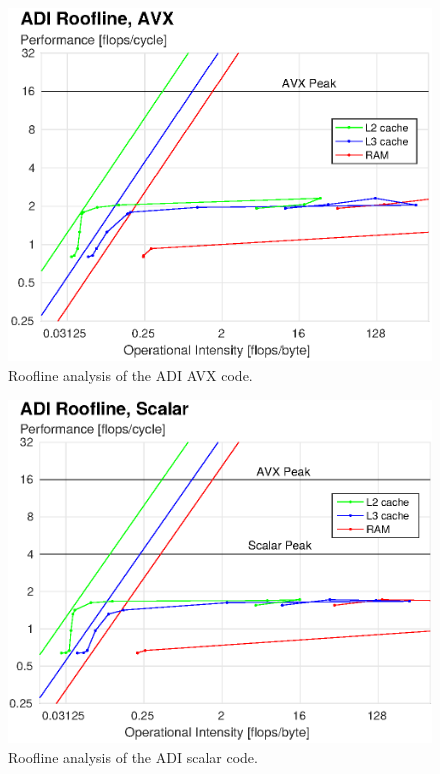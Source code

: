 \documentclass[letterpaper]{article}
\begin{document}
\begin{figure}\centering
  \includegraphics[width=\linewidth]{./plots/roofline_ADI_AVX_cropped.eps}
  \caption{Roofline analysis of the ADI AVX code.}
  \label{fig:roofline_ADI_AVX}
\end{figure}

\begin{figure}\centering
  \includegraphics[width=\linewidth]{./plots/roofline_ADI_scalar_cropped.eps}
  \caption{Roofline analysis of the ADI scalar code.}
  \label{fig:roofline_ADI_scalar}
\end{figure}
\end{document}
